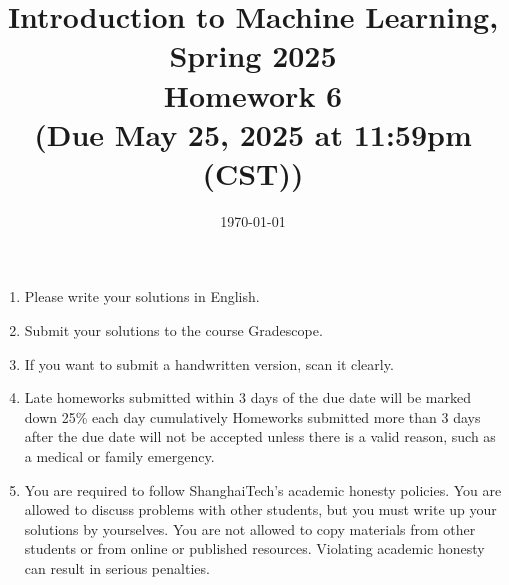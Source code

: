\documentclass[10pt]{article}
\begin{document}
\date{\today}
\title{Introduction to Machine Learning, Spring 2025 \\
	Homework 6 \\
	\small (Due May 25, 2025 at 11:59pm (CST))}
\maketitle

\begin{enumerate}
	\item Please write your solutions in English.
	\item Submit your solutions to the course Gradescope.
	\item If you want to submit a handwritten version, scan it clearly.
	\item Late homeworks submitted within 3 days of the due date will be marked down 25\% each day cumulatively Homeworks submitted more than 3 days after the due date will not be accepted unless there is a valid reason, such as a medical or family emergency.
	\item You are required to follow ShanghaiTech's academic honesty policies.  You are allowed to discuss problems with other students, but you must write up your solutions by yourselves.  You are not allowed to copy materials from other students or from online or published resources.  Violating academic honesty can result in serious penalties.
	\end{enumerate}
\newpage


\begin{enumerate}



\end{enumerate}
\end{document}
